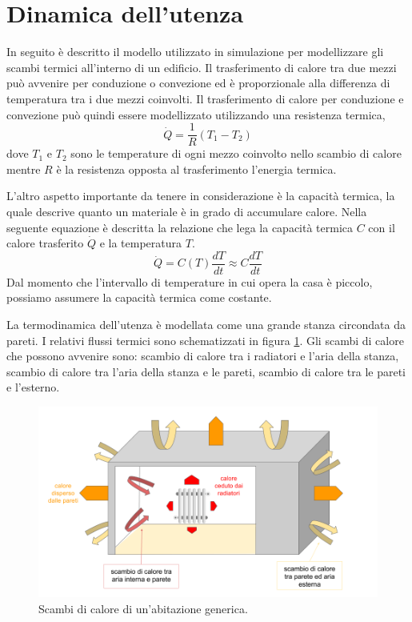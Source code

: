 \documentclass[laurea,oneside,11pt]{USiena_tesiLM}
\begin{document}
\section{Dinamica dell'utenza}
\label{sec:dinamicautenza}
In seguito è descritto il modello utilizzato in simulazione per modellizzare gli scambi termici all'interno di un edificio. 
Il trasferimento di calore tra due mezzi può avvenire per conduzione o convezione ed è proporzionale alla differenza di temperatura tra i due mezzi coinvolti. Il trasferimento di calore per conduzione e convezione può quindi essere modellizzato utilizzando una resistenza termica,
\begin{equation}
\dot{Q} = \frac{1}{R} (T_1-T_2)
\label{eq:q1}
\end{equation}
dove $T_1$ e $T_2$ sono le temperature di ogni mezzo coinvolto nello scambio di calore mentre $R$ è la resistenza opposta al trasferimento l'energia termica.

L'altro aspetto importante da tenere in considerazione è la capacità termica, la quale descrive quanto un materiale  è in grado di accumulare calore. Nella seguente equazione è descritta la relazione che lega la capacità termica $C$ con il calore trasferito $\dot{Q}$ e la temperatura $T$.
\begin{equation}
\dot{Q} = C(T) \frac{dT}{dt} \approx C \frac{dT}{dt}
\label{eq:q2}
\end{equation}
Dal momento che l'intervallo di temperature in cui opera la casa è piccolo, possiamo  assumere la capacità termica come costante.

La termodinamica dell'utenza è modellata come una grande stanza circondata da pareti. I relativi flussi termici sono schematizzati in figura \ref{fig:scambio}. Gli scambi di calore che possono avvenire sono: scambio di calore tra i radiatori e l'aria della stanza, scambio di calore tra l'aria della stanza e le pareti, scambio di calore tra le pareti e l'esterno.

\begin{figure}[h]
\begin{center}
\includegraphics[width=1.05\textwidth]{figure/scambio_casa}
\caption{Scambi di calore di un'abitazione generica.}
\label{fig:scambio}
\end{center}
\end{figure}
\end{document}
